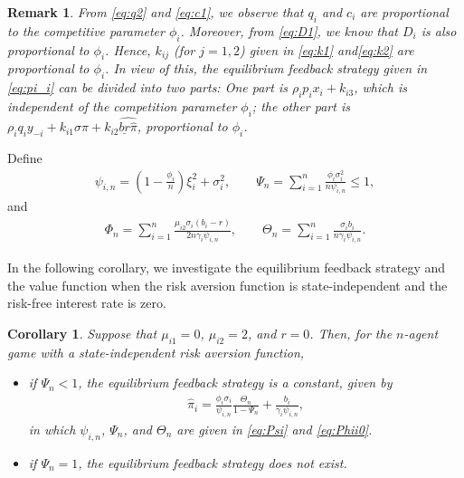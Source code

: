 \documentclass[11pt]{article}
\newtheorem{corollary}{Corollary}[section]
\newtheorem{remark}{Remark}[section]
\numberwithin{equation}{section}
\providecommand{\smn}{{-}} %
\begin{document}
\begin{remark}\label{re:prop}
	From \eqref{eq:q2} and \eqref{eq:c1}, we observe that \(q_i\) and \(c_i\) are proportional to the competitive parameter \(\phi_i\). Moreover, from \eqref{eq:D1}, we know that \(D_i\) is also proportional to \(\phi_i\). Hence, \(k_{ij}\) (for \(j=1,2\)) given in \eqref{eq:k1} and\eqref{eq:k2} are proportional to \(\phi_i\). In view of this, the equilibrium  feedback  strategy given in \eqref{eq:pi_i} can be divided into two parts: One part is \(\rho_i p_i x_i+k_{i3}\), which is independent of the competition parameter \(\phi_i\); the other part is $ \rho_i q_i y_{\smn i} + k_{i1} \widehat{\sigma\widehat{\pi}} + k_{i2}\widehat{\underline{br}\widehat{\pi}}$, proportional to \(\phi_i\).
\end{remark}
	Define
	\begin{align}
		\psi_{i,n} = \left(1- \frac{\phi_i}{n}\right)\xi_i^2+\sigma_i^2,\quad\quad\Psi_n=\sum_{i=1}^n\frac{\phi_i\sigma_i^2}{n\psi_{i,n}} \le 1,\label{eq:Psi}
	\end{align}
	and
	\begin{align}
		\Phi_n=\sum_{i=1}^n \frac{\mu_{i2}\sigma_i(b_i-r)}{2n\gamma_i\psi_{i,n}},\quad\quad \Theta_{n}=\sum_{i=1}^n \frac{ \sigma_i b_i}{n\gamma_i\psi_{i,n}}.  \label{eq:Phii0}
	\end{align}

In the following corollary, we investigate the equilibrium feedback strategy and the value function when the risk aversion function is state-independent and the risk-free interest rate is zero.

	\begin{corollary}\label{cor:020}
		Suppose that \(\mu_{i1}=0\), \(\mu_{i2}=2\), and \(r=0\).
		Then, for the \(n\)-agent game with a state-independent risk aversion function,
		\begin{itemize}
			\item[$(1)$] if \(\Psi_n<1\), the equilibrium feedback strategy is a constant, given by
			\begin{align}\label{eq:01pi}
				\widehat{\pi}_i =\frac{\phi_i\sigma_i}{\psi_{i,n}} \frac{\Theta_{n}}{1-\Psi_n}+\frac{b_i}{\gamma_i\psi_{i,n}},
			\end{align}
			in which \(\psi_{i,n}\), \(\Psi_n\), and \(\Theta_{n}\) are given in \eqref{eq:Psi} and \eqref{eq:Phii0}.
		\item[$(2)$] if  \(\Psi_n=1\), the equilibrium feedback strategy does not exist.
		\end{itemize}
	\end{corollary}
	
\end{document}
